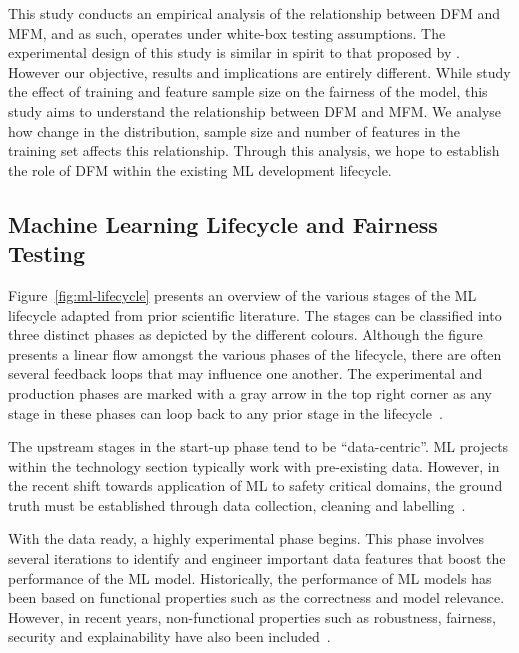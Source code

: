 \documentclass[sigconf,review,anonymous]{acmart}
\begin{document}
This study conducts an empirical analysis of the relationship between
DFM and MFM, and as such, operates under white-box testing
assumptions. The experimental design of this study is similar in
spirit to that proposed by \citeauthor{zhang2021ignorance}. However
our objective, results and implications are entirely different. While
\citeauthor{zhang2021ignorance} study the effect of training and
feature sample size on the fairness of the model, this study aims to
understand the relationship between DFM and MFM. We analyse how change
in the distribution, sample size and number of features in the
training set affects this relationship. Through this analysis, we hope
to establish the role of DFM within the existing ML development
lifecycle.

\subsection{Machine Learning Lifecycle and Fairness
  Testing}\label{sec:ml-lifecycle}

Figure \ref{fig:ml-lifecycle} presents an overview of the various
stages of the ML lifecycle adapted from prior scientific literature.
The stages can be classified into three distinct phases as depicted by
the different colours. Although the figure presents a linear flow
amongst the various phases of the lifecycle, there are often several
feedback loops that may influence one another. The experimental and
production phases are marked with a gray arrow in the top right corner
as any stage in these phases can loop back to any prior stage in the
lifecycle \cite{amershi2019software,haakman2020ai,breck2019data}.

The upstream stages in the start-up phase tend to be ``data-centric''.
ML projects within the technology section typically work with
pre-existing data. However, in the recent shift towards application of
ML to safety critical domains, the ground truth must be established
through data collection, cleaning and
labelling \cite{sambasivan2021everyone,bosch2021engineering,amershi2019software}.

With the data ready, a highly experimental phase begins. This phase
involves several iterations to identify and engineer important data
features that boost the performance of the ML model. Historically, the
performance of ML models has been based on functional properties such
as the correctness and model relevance. However, in recent years,
non-functional properties such as robustness, fairness, security and
explainability have also been included \cite{zhang2020machine}.
\end{document}
